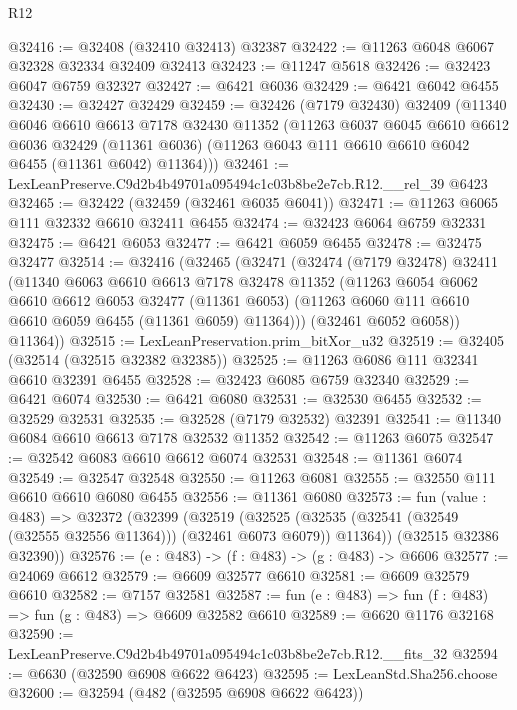 \begin{lexlean}{R12}
\begin{coremodule}
@32416 := @32408 (@32410 @32413) @32387
@32422 := @11263 @6048 @6067 @32328 @32334 @32409 @32413
@32423 := @11247 @5618
@32426 := @32423 @6047 @6759 @32327
@32427 := @6421 @6036
@32429 := @6421 @6042 @6455
@32430 := @32427 @32429
@32459 := @32426
    (@7179 @32430)
    @32409
    (@11340
      @6046
      @6610
      @6613
      @7178
      @32430
      @11352
      (@11263
        @6037
        @6045
        @6610
        @6612
        @6036
        @32429
        (@11361 @6036)
        (@11263 @6043 @111 @6610 @6610 @6042 @6455 (@11361 @6042) @11364)))
@32461 := LexLeanPreserve.C9d2b4b49701a095494c1c03b8be2e7cb.R12.__rel_39 @6423
@32465 := @32422 (@32459 (@32461 @6035 @6041))
@32471 := @11263 @6065 @111 @32332 @6610 @32411 @6455
@32474 := @32423 @6064 @6759 @32331
@32475 := @6421 @6053
@32477 := @6421 @6059 @6455
@32478 := @32475 @32477
@32514 := @32416
    (@32465
      (@32471
        (@32474
          (@7179 @32478)
          @32411
          (@11340
            @6063
            @6610
            @6613
            @7178
            @32478
            @11352
            (@11263
              @6054
              @6062
              @6610
              @6612
              @6053
              @32477
              (@11361 @6053)
              (@11263 @6060 @111 @6610 @6610 @6059 @6455 (@11361 @6059) @11364)))
          (@32461 @6052 @6058))
        @11364))
@32515 := LexLeanPreservation.prim_bitXor_u32
@32519 := @32405 (@32514 (@32515 @32382 @32385))
@32525 := @11263 @6086 @111 @32341 @6610 @32391 @6455
@32528 := @32423 @6085 @6759 @32340
@32529 := @6421 @6074
@32530 := @6421 @6080
@32531 := @32530 @6455
@32532 := @32529 @32531
@32535 := @32528 (@7179 @32532) @32391
@32541 := @11340 @6084 @6610 @6613 @7178 @32532 @11352
@32542 := @11263 @6075
@32547 := @32542 @6083 @6610 @6612 @6074 @32531
@32548 := @11361 @6074
@32549 := @32547 @32548
@32550 := @11263 @6081
@32555 := @32550 @111 @6610 @6610 @6080 @6455
@32556 := @11361 @6080
@32573 := fun (value : @483) =>
  @32372
    (@32399
      (@32519
        (@32525 (@32535 (@32541 (@32549 (@32555 @32556 @11364))) (@32461 @6073 @6079)) @11364))
      (@32515 @32386 @32390))
@32576 := (e : @483) -> (f : @483) -> (g : @483) -> @6606
@32577 := @24069 @6612
@32579 := @6609 @32577 @6610
@32581 := @6609 @32579 @6610
@32582 := @7157 @32581
@32587 := fun (e : @483) => fun (f : @483) => fun (g : @483) => @6609 @32582 @6610
@32589 := @6620 @1176 @32168
@32590 := LexLeanPreserve.C9d2b4b49701a095494c1c03b8be2e7cb.R12.__fits_32
@32594 := @6630 (@32590 @6908 @6622 @6423)
@32595 := LexLeanStd.Sha256.choose
@32600 := @32594 (@482 (@32595 @6908 @6622 @6423))

\end{coremodule}
\end{lexlean}
